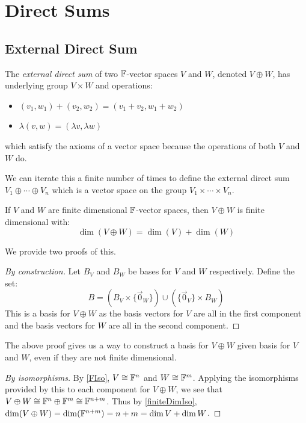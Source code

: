 \documentclass[../main.tex]{subfiles}
\begin{document}
\section{Direct Sums}
\subsection{External Direct Sum}
\begin{definition}
  The \textit{external direct sum} of two $\mathbb{F}$-vector spaces $V$ and $W$, denoted $V \oplus W$, has underlying group $V \times W$ and operations:
  \begin{itemize}
    \item $(v_1, w_1) + (v_2, w_2) = (v_1 + v_2, w_1 + w_2)$
    \item $\lambda(v, w) = (\lambda v, \lambda w)$
  \end{itemize}
  which satisfy the axioms of a vector space because the operations of both $V$ and $W$ do.
\end{definition}
We can iterate this a finite number of times to define the external direct sum $V_1 \oplus \cdots \oplus V_n$ which is a vector space on the group $V_1 \times \cdots \times V_n$.
\begin{lemma}
  If $V$ and $W$ are finite dimensional $\mathbb{F}$-vector spaces, then $V \oplus W$ is finite dimensional with: \label{externalDim}
  \[
    \dim(V \oplus W) = \dim(V) + \dim(W)
  \]
\end{lemma}
We provide two proofs of this.
\begin{proof}[By construction]
  Let $B_V$ and $B_W$ be bases for $V$ and $W$ respectively.
  Define the set:
  \[
    B = (B_V \times \{\vec{0}_W\}) \cup (\{\vec{0}_{V}\} \times B_W)
  \]
  This is a basis for $V \oplus W$ as the basis vectors for $V$ are all in the first component and the basis vectors for $W$ are all in the second component.
\end{proof}
\begin{remark}
  The above proof gives us a way to construct a basis for $V \oplus W$ given basis for $V$ and $W$, even if they are not finite dimensional.
\end{remark}
\begin{proof}[By isomorphisms]
  By \cref{FIso}, $V \cong \mathbb{F}^n$ and $W \cong \mathbb{F}^m$.
  Applying the isomorphisms provided by this to each component for $V \oplus W$, we see that $V \oplus W \cong \mathbb{F}^n \oplus \mathbb{F}^m \cong \mathbb{F}^{n + m}$.
  Thus by \cref{finiteDimIso}, $\dim(V \oplus W) = \dim(\mathbb{F}^{n + m}) = n + m = \dim V + \dim W$.
\end{proof}
\end{document}
